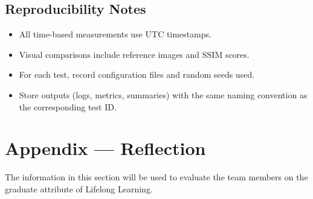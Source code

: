 \documentclass[12pt, titlepage]{article}
\begin{document}
\subsection{Reproducibility Notes}

\begin{itemize}
  \item All time-based measurements use UTC timestamps.
  \item Visual comparisons include reference images and SSIM scores.
  \item For each test, record configuration files and random seeds used.
  \item Store outputs (logs, metrics, summaries) with the same naming convention as the corresponding test ID.
\end{itemize}


\newpage{}
\section*{Appendix --- Reflection}


The information in this section will be used to evaluate the team members on the
graduate attribute of Lifelong Learning.


\end{document}
